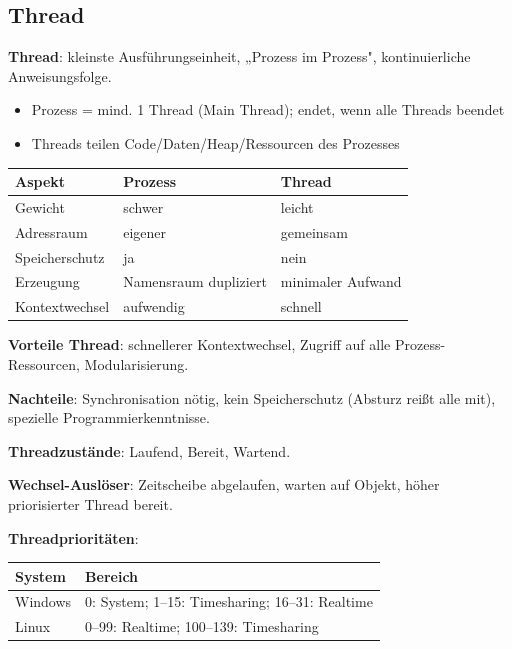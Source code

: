 \documentclass[11pt, a4paper]{article}
\begin{document}
\subsection{Thread}

\textbf{Thread}: kleinste Ausführungseinheit, „Prozess im Prozess", kontinuierliche Anweisungsfolge.

\begin{itemize}
  \item Prozess = mind. 1 Thread (Main Thread); endet, wenn alle Threads beendet
  \item Threads teilen Code/Daten/Heap/Ressourcen des Prozesses
\end{itemize}


{\small
\begin{tabularx}{\linewidth}{XXX}
\hline
\rowcolor{tableheadbg}
{\color{white}\textbf{Aspekt}} & {\color{white}\textbf{Prozess}} & {\color{white}\textbf{Thread}} \\[2pt]
\hline
\endhead
\hline
\endfoot
Gewicht & schwer & leicht \\
Adressraum & eigener & gemeinsam \\
Speicherschutz & ja & nein \\
Erzeugung & Namensraum dupliziert & minimaler Aufwand \\
Kontextwechsel & aufwendig & schnell \\
\end{tabularx}
}


\textbf{Vorteile Thread}: schnellerer Kontextwechsel, Zugriff auf alle Prozess-Ressourcen, Modularisierung.

\textbf{Nachteile}: Synchronisation nötig, kein Speicherschutz (Absturz reißt alle mit), spezielle Programmierkenntnisse.


\textbf{Threadzustände}: Laufend, Bereit, Wartend.


\textbf{Wechsel-Auslöser}: Zeitscheibe abgelaufen, warten auf Objekt, höher priorisierter Thread bereit.


\textbf{Threadprioritäten}:


{\small
\begin{tabularx}{\linewidth}{XX}
\hline
\rowcolor{tableheadbg}
{\color{white}\textbf{System}} & {\color{white}\textbf{Bereich}} \\[2pt]
\hline
\endhead
\hline
\endfoot
Windows & 0: System; 1–15: Timesharing; 16–31: Realtime \\
Linux & 0–99: Realtime; 100–139: Timesharing \\
\end{tabularx}
}
\end{document}
